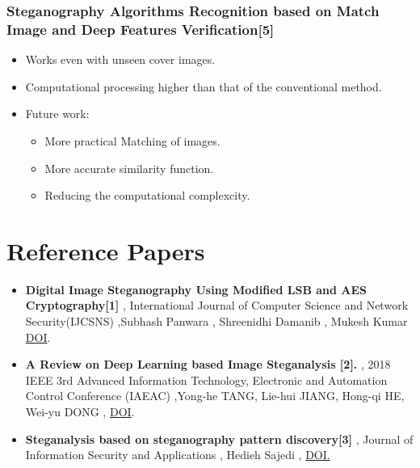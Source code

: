 \documentclass{beamer} %
\theoremstyle{definition} %
\begin{document}
\begin{frame}
\frametitle{Steganography Algorithms Recognition based on Match Image and Deep Features Verification[5] }
\begin{itemize}
\item Works even with unseen cover images.
\item Computational processing higher than that of the conventional method.
\item Future work:
\begin{itemize}
\item More practical Matching of images.
\item More accurate similarity function.
\item Reducing the computational complexcity.
\end{itemize}
\end{itemize}
\end{frame}



\section{Reference Papers}

\begin{itemize}
	\item{\textbf{Digital Image Steganography Using Modified LSB and AES Cryptography[1]} ,   International Journal of Computer Science and Network Security(IJCSNS) ,Subhash Panwara , Shreenidhi Damanib , Mukesh Kumar \href{http://www.ijrerd.com/papers/v3-i6/3-IJRERD-C149.pdf}{DOI}.}
	\end{itemize}

\begin{itemize}
	\item {\textbf{A Review on Deep Learning based Image Steganalysis [2]. } ,  2018 IEEE 3rd Advanced Information Technology, Electronic and Automation Control Conference (IAEAC) ,Yong-he TANG, Lie-hui JIANG, Hong-qi HE, Wei-yu DONG , \href{http://doi. org/10. 1109/IAEAC. 2018. 8577655} {DOI}. }
\end{itemize}

\begin{itemize}
    \item {\textbf{Steganalysis based on steganography pattern discovery[3]} , Journal of Information Security and Applications , Hedieh Sajedi , \href{https://doi.org/10.1016/jjisa. 2016. 04. 001}{DOI. } }
\end{itemize}
\end{document}
